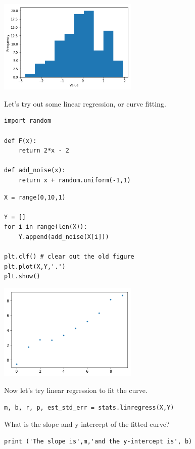 \begin{center}
\includegraphics[width=0.5\textwidth]{scipy/output_27_0.png}
\end{center}

Let's try out some linear regression, or curve fitting.

\begin{verbatim}
import random

def F(x):
    return 2*x - 2

def add_noise(x):
    return x + random.uniform(-1,1) 
\end{verbatim}

\begin{verbatim}
X = range(0,10,1)

Y = []
for i in range(len(X)):
    Y.append(add_noise(X[i]))

plt.clf() # clear out the old figure
plt.plot(X,Y,'.')
plt.show()
\end{verbatim}

\begin{center}
\includegraphics[width=0.5\textwidth]{scipy/output_30_0.png}
\end{center}

Now let's try linear regression to fit the curve.

\begin{verbatim}
m, b, r, p, est_std_err = stats.linregress(X,Y)
\end{verbatim}

What is the slope and y-intercept of the fitted curve?

\begin{verbatim}
print ('The slope is',m,'and the y-intercept is', b)
\end{verbatim}

